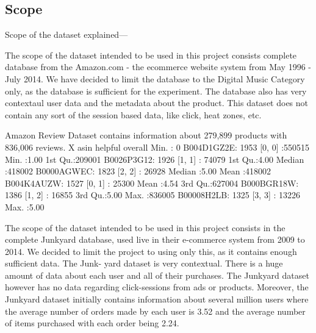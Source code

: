 \subsection{Scope}

Scope of the dataset explained---

The scope of the dataset intended to be used in this project consists complete database from the Amazon.com - the ecommerce website system from May 1996 - July 2014. We have decided to limit the database to the Digital Music Category only, as the database is sufficient for the experiment. The database also has very contextaul user data and the metadata about the product. This dataset does not contain any sort of the session based data, like click, heat zones, etc.

Amazon Review Dataset contains information about 279,899 products with 836,006 reviews.       
       X                asin           helpful          overall    
Min.   :     0   B004D1GZ2E:  1953   [0, 0] :550515   Min.   :1.00  
1st Qu.:209001   B0026P3G12:  1926   [1, 1] : 74079   1st Qu.:4.00  
Median :418002   B0000AGWEC:  1823   [2, 2] : 26928   Median :5.00  
Mean   :418002   B004K4AUZW:  1527   [0, 1] : 25300   Mean   :4.54  
3rd Qu.:627004   B000BGR18W:  1386   [1, 2] : 16855   3rd Qu.:5.00  
Max.   :836005   B00008H2LB:  1325   [3, 3] : 13226   Max.   :5.00  





The scope of the dataset intended to be used in this project consists in the complete
Junkyard database, used live in their e-commerce system from 2009 to 2014. We decided
to limit the project to using only this, as it contains enough sufficient data. The Junk-
yard dataset is very contextual. There is a huge amount of data about each user and all
of their purchases. The Junkyard dataset however has no data regarding click-sessions
from ads or products.
Moreover, the Junkyard dataset initially contains information about several million users
where the average number of orders made by each user is 3.52 and the average number
of items purchased with each order being 2.24.


